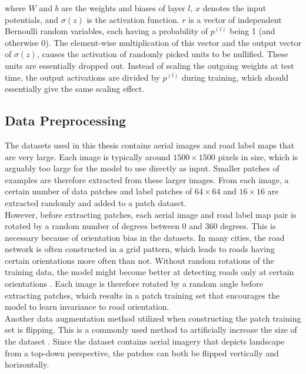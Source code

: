 \noindent where $W$ and $b$ are the weights and biases of layer $l$, $x$ denotes the input potentials, and $\sigma(z)$ is the activation function. $r$ is a vector of independent Bernoulli random variables, each having a probability of $p^{(l)}$ being 1 (and otherwise 0). The element-wise multiplication of this vector and the output vector of $\sigma(z)$, causes the activation of randomly picked units to be nullified. These units are essentially dropped out. Instead of scaling the outgoing weights at test time, the output activations are divided by $p^{(l)}$  during training, which should essentially give the same scaling effect.\\


\subsection{Data Preprocessing}
The datasets used in this thesis contains aerial images and road label maps that are very large. Each image is typically around $1500 \times 1500$ pixels in size, which is arguably too large for the model to use directly as input. Smaller patches of examples are therefore extracted from these larger images. From each image, a certain number of data patches and label patches of $64 \times 64$ and $16 \times 16$ are extracted randomly and added to a patch dataset.\\

However, before extracting patches, each aerial image and road label map pair is rotated by a random number of degrees between 0 and 360 degrees. This is necessary because of orientation bias in the datasets. In many cities, the road network is often constructed in a grid pattern, which leads to roads having certain orientations more often than not. Without random rotations of the training data, the model might become better at detecting roads only at certain orientations \citep{Mnih_roads_high_res_aerial_images}. Each image is therefore rotated by a random angle before extracting patches, which results in a patch training set that encourages the model to learn invariance to road orientation.\\

Another data augmentation method utilized when constructing the patch training set is flipping. This is a commonly used method to artificially increase the size of the dataset \citep{Krizhevsky_imagenet}. Since the dataset contains aerial imagery that depicts landscape from a top-down perspective, the patches can both be flipped vertically and horizontally.\\

